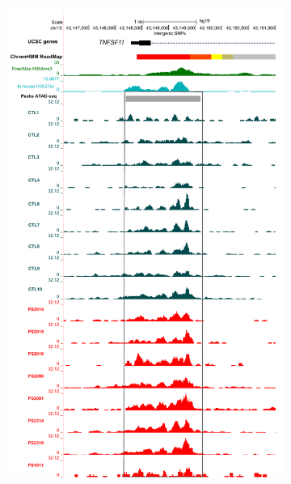 \begin{figure}[htbp]
\centering
\begin{subfigure}{0.5\textwidth}
\centering
\includegraphics[width=\textwidth]{./Results2/pdfs/UCSC_ATAC_CD8_peak_prom_TNFSF11}
\caption{\textbf{}}
\end{subfigure}%
\begin{subfigure}{0.5\textwidth}
\centering

\end{subfigure}
\end{figure}
